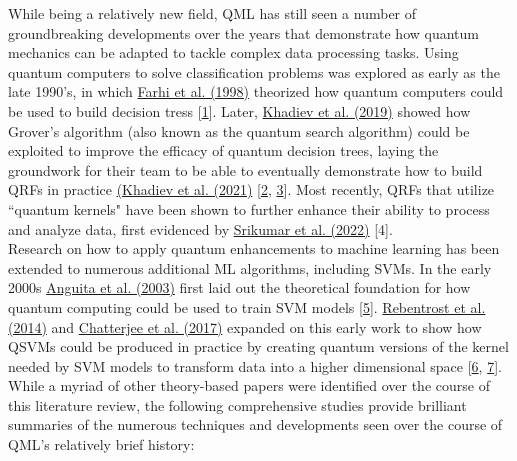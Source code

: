 \documentclass[11pt, oneside]{article}   	%
\begin{document}
While being a relatively new field, QML has still seen a number of groundbreaking developments over the years that demonstrate how quantum mechanics can be adapted to tackle complex data processing tasks. Using quantum computers to solve classification problems was explored as early as the late 1990's, in which \href{https://journals.aps.org/pra/abstract/10.1103/PhysRevA.58.915}{Farhi et al. (1998)} theorized how quantum computers could be used to build decision tress [\href{https://journals.aps.org/pra/abstract/10.1103/PhysRevA.58.915}{1}]. Later, \href{https://arxiv.org/abs/1907.06840}{Khadiev et al. (2019)} showed how  Grover's algorithm (also known as the quantum search algorithm) could be exploited to improve the efficacy of quantum decision trees, laying the groundwork for their team to be able to eventually demonstrate how to build QRFs in practice \href{https://arxiv.org/abs/2112.13346}{(Khadiev et al. (2021)} [\href{https://arxiv.org/abs/1907.06840}{2}, \href{https://arxiv.org/abs/2112.13346}{3}]. Most recently, QRFs that utilize ``quantum kernels" have been shown to further enhance their ability to process and analyze data, first evidenced by \href{https://arxiv.org/abs/2210.02355}{Srikumar et al. (2022)} [4]. \\

Research on how to apply quantum enhancements to machine learning has been extended to numerous additional ML algorithms, including SVMs. In the early 2000s \href{https://members.cbio.mines-paristech.fr/~jvert/svn/bibli/local/Anguita2003Quantum.pdf}{Anguita et al. (2003)} first laid out the theoretical foundation for how quantum computing could be used to train SVM models [\href{https://doi.org/10.1016/S0893-6080(03)00087-X}{5}]. \href{https://arxiv.org/abs/1307.0471}{Rebentrost et al. (2014)} and \href{https://doi.org/10.26421/QIC17.15-16}{Chatterjee et al. (2017)} expanded on this early work to show how QSVMs could be produced in practice by creating quantum versions of the kernel needed by SVM models to transform data into a higher dimensional space [\href{https://doi.org/10.1103/PhysRevLett.113.130503}{6}, \href{https://doi.org/10.26421/QIC17.15-16}{7}]. \\

While a myriad of other theory-based papers were identified over the course of this literature review, the following comprehensive studies provide brilliant summaries of the numerous techniques and developments seen over the course of QML's relatively brief history: 
\end{document}
